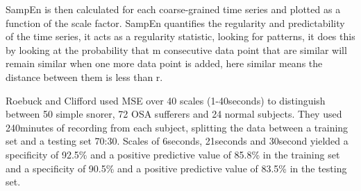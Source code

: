 SampEn is then calculated for each coarse-grained time series and plotted as a function of the scale factor. SampEn quantifies the regularity and predictability of the time series, it acts as a regularity statistic, looking for patterns, it does this by looking at the probability that m consecutive data point that are similar will remain similar when one more data point is added, here similar means the distance between them is less than r. 

Roebuck and Clifford used MSE over 40 scales (1-40seconds) to distinguish between 50 simple snorer, 72 OSA sufferers and 24 normal subjects. They used 240minutes of recording from each subject, splitting the data between a training set and a testing set 70:30. Scales of 6seconds, 21seconds and 30second yielded a specificity of 92.5\% and a positive predictive value of 85.8\% in the training set and a specificity of 90.5\% and a positive predictive value of 83.5\% in the testing set.
